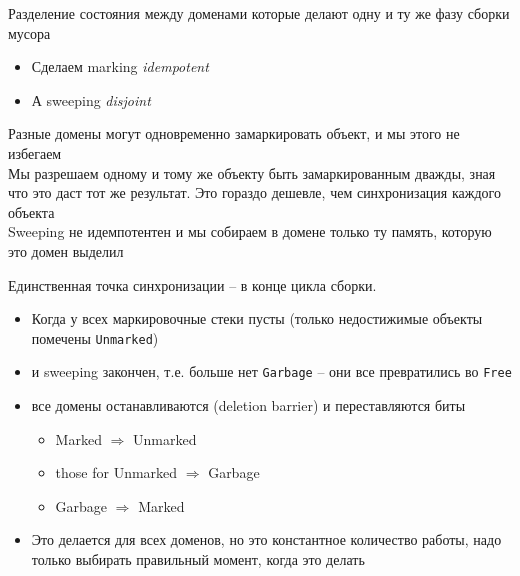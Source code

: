 \documentclass[aspectratio=169
  , xcolor={svgnames} 
  , hyperref={ colorlinks,citecolor=DeepPink4
             , linkcolor=DarkRed,urlcolor=DarkBlue}
  , russian
  ]{beamer}
\theoremstyle{exerciseStyle1}
\begin{document}
\begin{frame}[fragile]{Разделение состояния между доменами}
которые делают одну и ту же фазу сборки мусора
\begin{itemize}
  \item Сделаем  marking \textit{idempotent} 
  \item А sweeping  \textit{disjoint}
\end{itemize}\vspace{.5cm}

Разные домены могут одновременно замаркировать объект, и мы этого не избегаем\\

Мы разрешаем одному и тому же объекту быть замаркированным дважды, зная что это даст тот же результат. Это гораздо дешевле, чем синхронизация каждого объекта\\


Sweeping не идемпотентен и мы собираем в домене только ту память, которую это домен выделил 
\end{frame}

\begin{frame}{}
Единственная точка синхронизации -- в конце цикла сборки.

\begin{itemize}
  \item Когда у всех маркировочные стеки пусты (только недостижимые объекты помечены \texttt{Unmarked})
  \item и sweeping закончен, т.е. больше нет \texttt{Garbage} -- они все превратились во \texttt{Free}
  \item все домены останавливаются  (deletion barrier) и переставляются биты
  
  \begin{itemize}
  \item Marked $\Rightarrow$ Unmarked
  \item those for Unmarked  $\Rightarrow$  Garbage
  \item  Garbage  $\Rightarrow$  Marked
  \end{itemize}
  \item Это делается для всех доменов, но это константное количество работы, надо только выбирать правильный момент, когда это делать

\end{itemize}
\end{frame}
\end{document}
